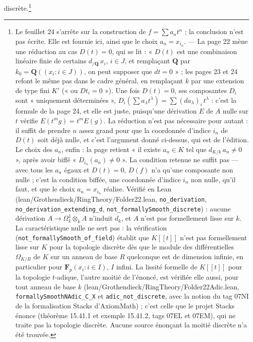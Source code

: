 \documentclass[11pt,a4paper]{article}
\begin{document}
discrète.\footnote{Le feuillet 24 s'arrête sur la construction de $f = \sum a_n
t^n$ ; la conclusion n'est pas écrite. Elle est fournie ici, ainsi que le
choix $a_n = x_{i_n}$. — La page 22 mène une réduction au cas $D(t) = 0$, qui
se lit : « $D(t)$ est une combinaison linéaire finie de certains
$d_{/\mathbf{Q}}\, x_i$, $i \in J$, et remplaçant $\mathbf{Q}$ par
$k_0 = \mathbf{Q}((x_i : i \in J))$, on peut supposer que $dt = 0$ » ; les
pages 23 et 24 refont le même pas dans le cadre général, en remplaçant $k$ par
une extension de type fini $K'$ (« ou $D t_i = 0$ »). Une fois $D(t) = 0$, ses
composantes $D_i$ sont « uniquement déterminées », $D_i(\sum a_\lambda
t^\lambda) = \sum (d a_\lambda)_i\, t^\lambda$ : c'est la formule de la page 24,
et elle est juste, puisqu'une dérivation $E$ de $A$ nulle sur $t$ vérifie
$E(t^m g) = t^m E(g)$. La réduction n'est pas nécessaire pour autant : il
suffit de prendre $n$ assez grand pour que la coordonnée d'indice $i_n$ de
$D(t)$ soit déjà nulle, et c'est l'argument donné ci-dessus, qui est de
l'édition. Le choix des $a_n$, enfin : la page retient « il existe
$a_n \in K$ tel que $d_{K/k}\, a_n \neq 0$ », après avoir biffé
« $D_{i_n}(a_n) \neq 0$ ». La condition retenue ne suffit pas — avec tous les
$a_n$ égaux et $D(t) = 0$, $D(f)$ n'a qu'une composante non nulle ; c'est la condition biffée,
une coordonnée d'indice $i_n$ non nulle, qu'il faut, et que le choix
$a_n = x_{i_n}$ réalise. Vérifié en Lean (lean/Grothendieck/RingTheory/Folder22.lean,
\texttt{no\_derivation}, \texttt{no\_derivation\_extending\_d},
\texttt{not\_formallySmooth\_discrete}) : aucune dérivation $A \to \Omega^1_k
\otimes_k A$ n'induit $d_k$, et $A$ n'est pas formellement lisse sur $k$. La
caractéristique nulle ne sert pas : la vérification
(\texttt{not\_formallySmooth\_of\_field}) établit que $K[[t]]$ n'est pas
formellement lisse sur $K$ pour la topologie discrète dès que le module des
différentielles $\Omega_{K/R}$ de $K$ sur un anneau de base $R$ quelconque est
de dimension infinie, en particulier pour $\mathbf{F}_p(x_i : i \in I)$, $I$
infini. La lissité formelle de $K[[t]]$ pour la topologie $t$-adique, l'autre
moitié de l'énoncé, est vérifiée elle aussi, pour tout anneau de base $k$
(lean/Grothendieck/RingTheory/Folder22Adic.lean, \texttt{formallySmoothNAdic\_C\_X} et
\texttt{adic\_not\_discrete}, avec la notion du tag 07NI de la formalisation
Stacks d'AxiomMath) ; c'est celle que le projet Stacks énonce (théorème 15.41.1
et exemple 15.41.2, tags 07EL et 07EM), qui ne traite pas la topologie
discrète. Aucune source énonçant la moitié
discrète n'a été trouvée.}
\end{document}
